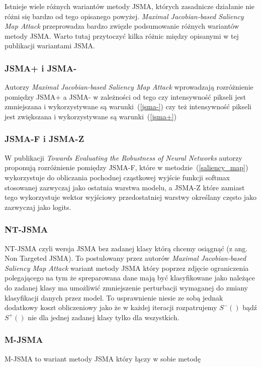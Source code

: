 \documentclass{article}
\begin{document}
Istnieje wiele różnych wariantów metody JSMA, których zasadnicze działanie nie różni się bardzo od tego opisanego powyżej.
\textit{Maximal Jacobian-based Saliency Map Attack}\cite{DBLP:journals/corr/abs-1808-07945} przeprowadza bardzo
zwięzłe podsumowanie różnych wariantów metody JSMA. Warto tutaj przytoczyć kilka różnic między opisanymi w tej publikacji
wariantami JSMA.

\subsubsection{JSMA+ i JSMA-}
Autorzy \textit{Maximal Jacobian-based Saliency Map Attack}\cite{DBLP:journals/corr/abs-1808-07945} wprowadzają rozróżnienie
pomiędzy JSMA+ a JSMA- w zależności od tego czy intensywność pikseli jest zmniejszana i wykorzystywane są warunki~(\ref{jsma-})
czy też intensywność pikseli jest zwiększana i wykorzystywane są warunki~(\ref{jsma+})

\subsubsection{JSMA-F i JSMA-Z}
W publikacji \textit{Towards Evaluating the Robustness of Neural Networks}\cite{DBLP:journals/corr/CarliniW16a}
autorzy proponują rozróżnienie pomiędzy JSMA-F, które w metodzie~(\ref{saliency_map}) wykorzystuje do obliczania pochodnej cząstkowej
wyjście funkcji softmax stosowanej zazwyczaj jako ostatnia warstwa modelu, a JSMA-Z które zamiast tego wykorzystuje wektor
wyjściowy przedostatniej warstwy określany często jako zazwyczaj jako logits.

\subsubsection{NT-JSMA}
NT-JSMA czyli wersja JSMA bez zadanej klasy którą chcemy osiągnąć (z ang. Non Targeted JSMA). To postulowany przez autorów
\textit{Maximal Jacobian-based Saliency Map Attack}\cite{DBLP:journals/corr/abs-1808-07945} wariant metody JSMA
który poprzez zdjęcie ograniczenia polegającego na tym że spreparowana dane mają być klasyfikowane jako należące do zadanej
klasy ma umożliwić zmniejszenie perturbacji wymaganej do zmiany klasyfikacji danych przez model. To usprawnienie niesie
ze sobą jednak dodatkowy koszt obliczeniowy jako że w każdej iteracji rozpatrujemy $S^{-}()$ bądź $S^{+}()$ nie dla
jednej zadanej klasy tylko dla wszystkich.

\subsubsection{M-JSMA}
M-JSMA\cite{DBLP:journals/corr/abs-1808-07945} to wariant metody JSMA który łączy w sobie metodę
\end{document}
